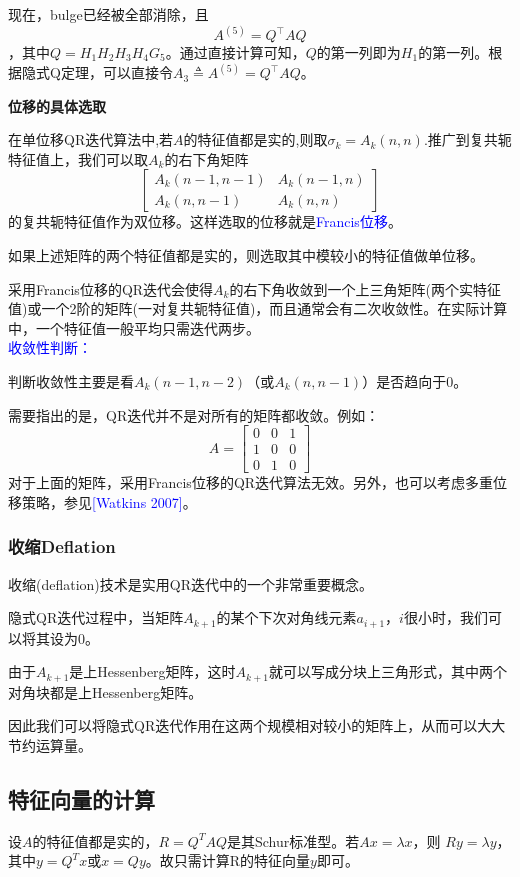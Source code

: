 \documentclass[12pt,a4paper]{article}
\begin{document}
现在，bulge已经被全部消除，且$$A^{(5)}=Q^{\top} A Q$$，其中$Q=H_{1} H_{2} H_{3} H_{4} G_{5}$。通过直接计算可知，$Q$的第一列即为$H_1$的第一列。根据隐式Q定理，可以直接令$A_{3} \triangleq A^{(5)}=Q^{\top} A Q$。

\textbf{位移的具体选取}

在单位移QR迭代算法中,若$A$的特征值都是实的,则取$\sigma_{k}=A_{k}(n, n)$.推广到复共轭特征值上，我们可以取$A_k$的右下角矩阵$$
\left[\begin{array}{cc}{A_{k}(n-1, n-1)} & {A_{k}(n-1, n)} \\ {A_{k}(n, n-1)} & {A_{k}(n, n)}\end{array}\right]
$$的复共轭特征值作为双位移。这样选取的位移就是\textcolor{blue}{Francis位移}。

如果上述矩阵的两个特征值都是实的，则选取其中模较小的特征值做单位移。

采用Francis位移的QR迭代会使得$A_k$的右下角收敛到一个上三角矩阵(两个实特征值)或一个2阶的矩阵(一对复共轭特征值)，而且通常会有二次收敛性。在实际计算中，一个特征值一般平均只需迭代两步。\\
\textcolor{blue}{收敛性判断：}

判断收敛性主要是看$A_{k}(n-1, n-2)$（或$A_{k}(n, n-1)$）是否趋向于$0$。

需要指出的是，QR迭代并不是对所有的矩阵都收敛。例如：$$A=\left[\begin{array}{lll}{0} & {0} & {1} \\ {1} & {0} & {0} \\ {0} & {1} & {0}\end{array}\right]$$
对于上面的矩阵，采用Francis位移的QR迭代算法无效。另外，也可以考虑多重位移策略，参见\textcolor{blue}{[Watkins 2007]}。
\subsubsection{收缩Deflation}
收缩(deflation)技术是实用QR迭代中的一个非常重要概念。

隐式QR迭代过程中，当矩阵$A_{k+1}$的某个下次对角线元素$a_{i+1}$，$i$很小时，我们可以将其设为$0$。

由于$A_{k+1}$是上Hessenberg矩阵，这时$A_{k+1}$就可以写成分块上三角形式，其中两个对角块都是上Hessenberg矩阵。

因此我们可以将隐式QR迭代作用在这两个规模相对较小的矩阵上，从而可以大大节约运算量。
\subsection{特征向量的计算}
设$A$的特征值都是实的，$R=Q^TAQ$是其Schur标准型。若$Ax=\lambda x$，则 $Ry=\lambda y$，其中$y=Q^Tx$或$x=Qy$。故只需计算R的特征向量$y$即可。
\end{document}
